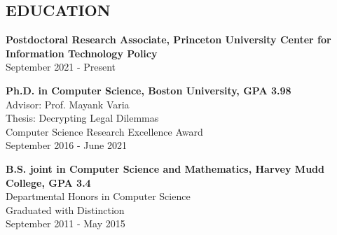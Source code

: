 \documentclass{res}
\begin{document}
 



\address{\texttt{sarah.ann.scheffler@gmail.com}\\\texttt{https://sarahscheffler.net}\\\texttt{https://github.com/sarahscheffler}}
\address{~~~~~~~~~~18 Vandeventer Ave \#1\\~~~~~~~~~~~~~~Princeton, NJ 08542\\~~~~~~~~~~~~~~~~~~~~\hspace{-0.049cm}(720) 234 - 6853}
                                  
\begin{resume}


%

    \vspace{0.1in}
\section{EDUCATION}  
\vspace{0.1in}

    \textbf{Postdoctoral Research Associate, Princeton University Center for Information Technology Policy} \\
    September 2021 - Present

    \textbf{Ph.D. in Computer Science, Boston University, GPA 3.98} \\
    Advisor: Prof. Mayank Varia \\
    Thesis: Decrypting Legal Dilemmas \\
    Computer Science Research Excellence Award \\
    September 2016 - June 2021

    \textbf{B.S. joint in Computer Science and Mathematics, Harvey Mudd College, GPA 3.4}  \\        
    Departmental Honors in Computer Science \\
    Graduated with Distinction \\
    September 2011 - May 2015


\end{resume}
\end{document}
